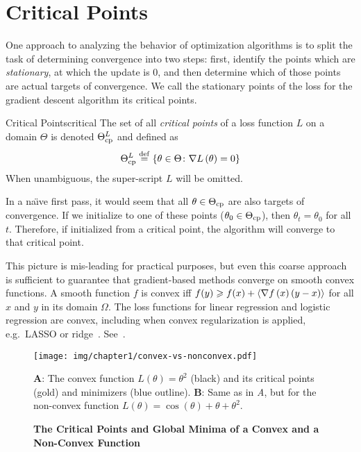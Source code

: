 \documentclass[../../thesis.tex]{subfiles}
\begin{document}
\section{Critical Points}

One approach to analyzing the behavior of optimization algorithms
is to split the task of determining convergence
into two steps:
first, identify the points which are \emph{stationary},
at which the update is $0$,
and then determine which of those points are actual targets of convergence.
We call the stationary points of the loss
for the gradient descent algorithm its critical points.
\begin{definition}{Critical Points}{critical}
	The set of all \emph{critical points} of a loss function $L$
	on a domain $\Theta$ is denoted $\Theta^L_{\mathrm{cp}}$ and defined as
	\begin{equation}\equationlabel{def-thetacp}
		\Theta^L_{\cp} \defeq \Set{\theta \in \Theta \suchthat \grad{L}{\theta} = 0}
	\end{equation}
	When unambiguous, the super-script $L$ will be omitted.
\end{definition}
In a na{\"\i}ve first pass,
it would seem that all $\theta \in \Theta_{\mathrm{cp}}$
are also targets of convergence.
If we initialize  to one of these points
($\theta_{0} \in \Theta_{\mathrm{cp}}$),
then $\theta_t = \theta_0$ for all $t$.
Therefore, if initialized from a critical point,
the algorithm will converge to that critical point.

This picture is mis-leading for practical purposes,
but even this coarse approach is sufficient to guarantee
that gradient-based methods converge on smooth convex functions.
A smooth function $f$ is convex iff
$f(y) \geqslant f(x) + \langle\nabla f\left(x\right)(y - x)\rangle$
for all $x$ and $y$ in its domain $\Omega$.
The loss functions for linear regression and
logistic regression are convex,
including when convex regularization is applied,
e.g.~LASSO or ridge~\cite{hastie2016}.
See~.

\begin{figure}[ht]
	\begin{center}
		\texttt{[image: img/chapter1/convex-vs-nonconvex.pdf]}
	\end{center}
	\caption{\textbf{The Critical Points and Global Minima
	of a Convex and a Non-Convex Function}}{\textbf{A}:
	The convex function $L(\theta) = \theta^2$ (black)
	and its critical points (gold)
	and minimizers (blue outline).
	\textbf{B}:
	Same as in \emph{A}, but for the non-convex function
	$L(\theta) = \cos(\theta) + \theta +\theta^2$.}
\end{figure}
\end{document}
